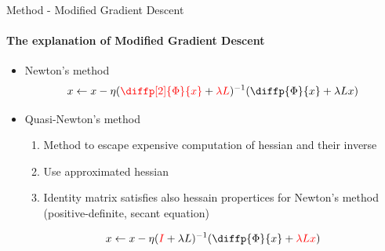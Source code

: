 \documentclass[beamer]{standalone}
\begin{document}
\begin{frame}{Method - Modified Gradient Descent}
\framesubtitle{The explanation of Modified Gradient Descent}
\begin{itemize}
    \item Newton's method
    \begin{equation*}
        x \leftarrow 
        x - \eta ( 
            \textcolor{red}{ \diffp[2]{\Phi}{x} } + \textcolor{red}{\lambda L}
            )^{-1} (\diffp{\Phi}{x}+\lambda L x)
    \end{equation*}
    \item Quasi-Newton's method
    \begin{enumerate}
        \item Method to escape expensive computation of hessian and their inverse
        \item Use approximated hessian
        \item Identity matrix satisfies also hessain propertices for Newton's method (positive-definite, secant equation)
    \end{enumerate}
    \begin{equation}
        x \leftarrow
        x - \eta (
            \textcolor{red}{I} + \lambda L)^{-1} (\diffp{\Phi} {x} 
            + \textcolor{red}{\lambda L x}
            )
    \end{equation}
\end{itemize}
    

\end{frame}
\end{document}
